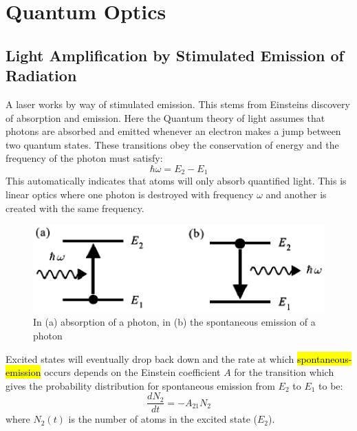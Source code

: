 \documentclass{article}
\begin{document}
\section{Quantum Optics}
\subsection{Light Amplification by Stimulated Emission of Radiation}
A laser works by way of stimulated emission. This stems from Einsteins discovery of absorption and emission.
Here the Quantum theory of light assumes that photons are absorbed and emitted whenever an electron makes a jump between two quantum states. These transitions obey the conservation of energy and the frequency of the photon must satisfy:
\begin{equation}
    \hbar\omega = E_2 - E_1
\end{equation}
This automatically indicates that atoms will only absorb quantified light. This is linear optics where one photon is destroyed with frequency $\omega$ and another is created with the same frequency.

\begin{figure}[!phbt]
    \centering
    \includegraphics[width=0.65\linewidth]{img/absorption.eps}
    \caption{In (a) absorption of a photon, in (b) the spontaneous emission of a photon}
    \label{fig:absorption}
\end{figure}

Excited states will eventually drop back down and the rate at which \hl{spontaneous-emission} occurs depends on the Einstein coefficient $A$ for the transition which gives the probability distribution for spontaneous emission from $E_2$ to $E_1$ to be:
\begin{equation}
	\frac{dN_2}{dt} = -A_{21}N_2
\end{equation}
where $N_2(t)$ is the number of atoms in the excited state ($E_2$).
\end{document}
